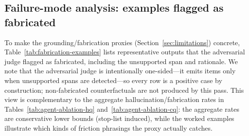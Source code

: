 \subsection{Failure-mode analysis: examples flagged as fabricated}
To make the grounding/fabrication proxies (Section~\ref{sec:limitations}) concrete, Table~\ref{tab:fabrication-examples} lists representative outputs that the adversarial judge flagged as fabricated, including the unsupported span and rationale. We note that the adversarial judge is intentionally one-sided---it emits items only when unsupported spans are detected---so every row is a positive case by construction; non-fabricated counterfactuals are not produced by this pass. This view is complementary to the aggregate hallucination/fabrication rates in Tables~\ref{tab:agent-ablation-hq} and~\ref{tab:agent-ablation-cq}: the aggregate rates are conservative lower bounds (stop-list induced), while the worked examples illustrate which kinds of friction phrasings the proxy actually catches.

